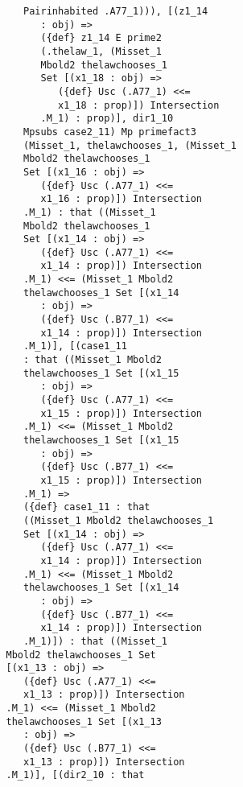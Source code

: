 \documentclass[12pt]{article}
\begin{document}
\begin{verbatim}
                   Pairinhabited .A77_1))), [(z1_14 
                      : obj) => 
                      ({def} z1_14 E prime2 
                      (.thelaw_1, (Misset_1 
                      Mbold2 thelawchooses_1 
                      Set [(x1_18 : obj) => 
                         ({def} Usc (.A77_1) <<= 
                         x1_18 : prop)]) Intersection 
                      .M_1) : prop)], dir1_10 
                   Mpsubs case2_11) Mp primefact3 
                   (Misset_1, thelawchooses_1, (Misset_1 
                   Mbold2 thelawchooses_1 
                   Set [(x1_16 : obj) => 
                      ({def} Usc (.A77_1) <<= 
                      x1_16 : prop)]) Intersection 
                   .M_1) : that ((Misset_1 
                   Mbold2 thelawchooses_1 
                   Set [(x1_14 : obj) => 
                      ({def} Usc (.A77_1) <<= 
                      x1_14 : prop)]) Intersection 
                   .M_1) <<= (Misset_1 Mbold2 
                   thelawchooses_1 Set [(x1_14 
                      : obj) => 
                      ({def} Usc (.B77_1) <<= 
                      x1_14 : prop)]) Intersection 
                   .M_1)], [(case1_11 
                   : that ((Misset_1 Mbold2 
                   thelawchooses_1 Set [(x1_15 
                      : obj) => 
                      ({def} Usc (.A77_1) <<= 
                      x1_15 : prop)]) Intersection 
                   .M_1) <<= (Misset_1 Mbold2 
                   thelawchooses_1 Set [(x1_15 
                      : obj) => 
                      ({def} Usc (.B77_1) <<= 
                      x1_15 : prop)]) Intersection 
                   .M_1) => 
                   ({def} case1_11 : that 
                   ((Misset_1 Mbold2 thelawchooses_1 
                   Set [(x1_14 : obj) => 
                      ({def} Usc (.A77_1) <<= 
                      x1_14 : prop)]) Intersection 
                   .M_1) <<= (Misset_1 Mbold2 
                   thelawchooses_1 Set [(x1_14 
                      : obj) => 
                      ({def} Usc (.B77_1) <<= 
                      x1_14 : prop)]) Intersection 
                   .M_1)]) : that ((Misset_1 
                Mbold2 thelawchooses_1 Set 
                [(x1_13 : obj) => 
                   ({def} Usc (.A77_1) <<= 
                   x1_13 : prop)]) Intersection 
                .M_1) <<= (Misset_1 Mbold2 
                thelawchooses_1 Set [(x1_13 
                   : obj) => 
                   ({def} Usc (.B77_1) <<= 
                   x1_13 : prop)]) Intersection 
                .M_1)], [(dir2_10 : that 

\end{verbatim}
\end{document}
